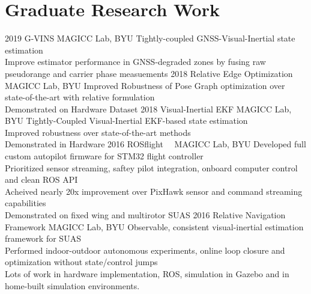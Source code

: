 
\section{Graduate Research Work}

\begin{entrylist}
\entry
  {2019}
  {G-VINS}
  {MAGICC Lab, BYU}
  {
  Tightly-coupled GNSS-Visual-Inertial state estimation\\
  Improve estimator performance in GNSS-degraded zones by fusing raw pseudorange and carrier phase measuements
  }
\entry
  {2018}
  {Relative Edge Optimization}
  {MAGICC Lab, BYU}
  {
  Improved Robustness of Pose Graph optimization over state-of-the-art with relative formulation\\
  Demonstrated on Hardware Dataset
  }
\entry
  {2018}
  {Visual-Inertial EKF}
  {MAGICC Lab, BYU}
  {
  Tightly-Coupled Visual-Inertial EKF-based state estimation\\
  Improved robustness over state-of-the-art methods\\
  Demonstrated in Hardware
  }
\entry
  {2016}
  {ROSflight~\rosflight~}
  {MAGICC Lab, BYU}
  {
  Developed full custom autopilot firmware for STM32 flight controller\\
  Prioritized sensor streaming, saftey pilot integration, onboard computer control and clean ROS API\\
  Acheived nearly 20x improvement over PixHawk sensor and command streaming capabilities\\
  Demonstrated on fixed wing and multirotor SUAS
  }
\entry
  {2016}
  {Relative Navigation Framework}
  {MAGICC Lab, BYU}
  {
  Observable, consistent visual-inertial estimation framework for SUAS \\
  Performed indoor-outdoor autonomous experiments, online loop closure and optimization without state/control jumps\\
  Lots of work in hardware implementation, ROS, simulation in Gazebo and in home-built simulation environments.
  }
  
\end{entrylist}